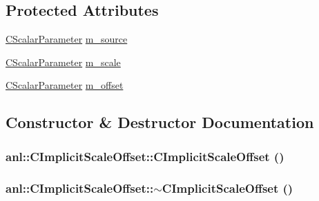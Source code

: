 \subsection*{Protected Attributes}
\begin{DoxyCompactItemize}
\item 
\hyperlink{classanl_1_1CScalarParameter}{CScalarParameter} \hyperlink{classanl_1_1CImplicitScaleOffset_ab388ab71edb0c8f86b5612df76aca7e4}{m\_\-source}
\item 
\hyperlink{classanl_1_1CScalarParameter}{CScalarParameter} \hyperlink{classanl_1_1CImplicitScaleOffset_a5317178b9bd28f77f46ffd24454cadf9}{m\_\-scale}
\item 
\hyperlink{classanl_1_1CScalarParameter}{CScalarParameter} \hyperlink{classanl_1_1CImplicitScaleOffset_ad003f12ab51436f9e59a8c52061f6a5a}{m\_\-offset}
\end{DoxyCompactItemize}


\subsection{Constructor \& Destructor Documentation}
\hypertarget{classanl_1_1CImplicitScaleOffset_a4df77c627577e554c3eead5cb541579a}{
\subsubsection[{CImplicitScaleOffset}]{\setlength{\rightskip}{0pt plus 5cm}anl::CImplicitScaleOffset::CImplicitScaleOffset ()}}
\label{classanl_1_1CImplicitScaleOffset_a4df77c627577e554c3eead5cb541579a}
\hypertarget{classanl_1_1CImplicitScaleOffset_a663b26e4701ff4e8818df6e776b7d8bc}{
\subsubsection[{$\sim$CImplicitScaleOffset}]{\setlength{\rightskip}{0pt plus 5cm}anl::CImplicitScaleOffset::$\sim$CImplicitScaleOffset ()}}
\label{classanl_1_1CImplicitScaleOffset_a663b26e4701ff4e8818df6e776b7d8bc}


